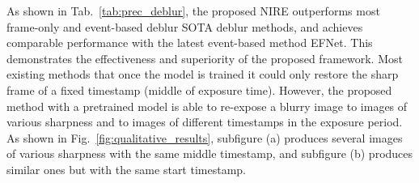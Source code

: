 \documentclass[10pt,twocolumn,letterpaper]{article}
\begin{document}
As shown in Tab.~\ref{tab:prec_deblur},
the proposed NIRE outperforms most frame-only and event-based deblur SOTA deblur methods, and achieves comparable performance with the latest event-based method EFNet.
This demonstrates the effectiveness and superiority of the proposed framework.
Most existing methods that once the model is trained it could only restore the sharp frame of a fixed timestamp (\eg middle of exposure time). 
However, the proposed method with a pretrained model is able to re-expose a blurry image to images of various sharpness and to images of different timestamps in the exposure period.
As shown in Fig.~\ref{fig:qualitative_results}, subfigure (a) produces several images of various sharpness with the same middle timestamp, and subfigure (b) produces similar ones but with the same start timestamp.   
\end{document}
